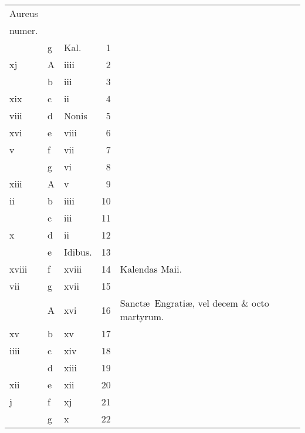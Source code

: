 \documentclass[11pt,openany]{book}
\begin{document}
\begin{center}
\begin{tabular}{l | l | l | r | l r}
\color{Red}Aureus & & & & \color{Red} \\
\color{Red}numer. & & & & \color{Red} \\
\color{Red}  & g & \color{Red} Kal. & 1 & & \color{Red} \\
\color{Red} xj & \color{Red} A & \color{Red} iiii & 2 & & \color{Red} \\
\color{Red}  & b & \color{Red} iii & 3 & & \color{Red} \\
\color{Red} xix & c & \color{Red} ii & 4 & & \color{Red} \\
\color{Red} viii & d & Nonis & 5 & & \color{Red} \\
\color{Red} xvi & e & \color{Red} viii & 6 & & \color{Red} \\
\color{Red} v & f & \color{Red} vii & 7 & & \color{Red} \\
\color{Red}  & g & \color{Red} vi & 8 & & \color{Red} \\
\color{Red} xiii & \color{Red} A & \color{Red} v & 9 & & \color{Red} \\
\color{Red} ii & b & \color{Red} iiii & 10 & & \color{Red} \\
\color{Red}  & c & \color{Red} iii & 11 & & \color{Red} \\
\color{Red} x & d & \color{Red} ii & 12 & & \color{Red} \\
\color{Red}  & e & Idibus. & 13 & & \color{Red} \\
\color{Red} xviii & f & \color{Red} xviii & 14 & \qquad \color{Red} Kalendas Maii. & \color{Red} \\
\color{Red} vii & g & \color{Red} xvii & 15 & & \color{Red} \\
\color{Red}  & \color{Red} A & \color{Red} xvi & 16 & Sanct\ae \ Engrati\ae , vel decem \& octo martyrum. & \color{Red} \\
\color{Red} xv & b & \color{Red} xv & 17 & & \color{Red} \\
\color{Red} iiii & c & \color{Red} xiv & 18 & & \color{Red} \\
\color{Red}  & d & \color{Red} xiii & 19 & & \color{Red} \\
\color{Red} xii & e & \color{Red} xii & 20 & & \color{Red} \\
\color{Red} j & f & \color{Red} xj & 21 & & \color{Red} \\
\color{Red}  & g & \color{Red} x & 22 & & \color{Red} \\

\end{tabular}
\end{center}
\end{document}
